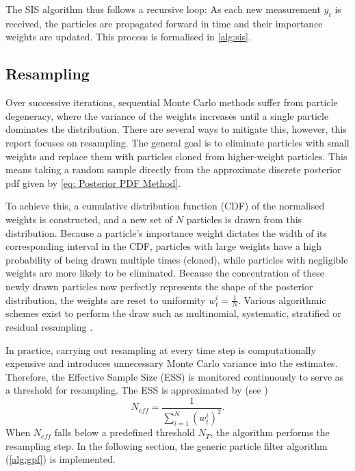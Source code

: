 \documentclass[10pt, a4paper]{article}
\numberwithin{equation}{section}
\begin{document}
The SIS algorithm thus follows a recursive loop: As each new measurement \(y_t\) is received, the particles are propagated forward in time and their importance weights are updated. This process is formalised in \autoref{alg:sis}.

\begin{algorithm}[ht]
\caption{SIS Particle Filter}\label{alg:sis}
\begin{algorithmic}[1]
\ttfamily
{}
\EndFor{}
\end{algorithmic}
\end{algorithm}


\subsection{Resampling}

Over successive iterations, sequential Monte Carlo methods suffer from particle degeneracy, where the variance of the weights increases until a single particle dominates the distribution. There are several ways to mitigate this, however, this report focuses on resampling. The general goal is to eliminate particles with small weights and replace them with particles cloned from higher-weight particles. This means taking a random sample directly from the approximate discrete posterior pdf given by \autoref{eq: Posterior PDF Method}. 

To achieve this, a cumulative distribution function (CDF) of the normalised weights is constructed, and a new set of \(N\) particles is drawn from this distribution. Because a particle's importance weight dictates the width of its corresponding interval in the CDF, particles with large weights have a high probability of being drawn multiple times (cloned), while particles with negligible weights are more likely to be eliminated. Because the concentration of these newly drawn particles now perfectly represents the shape of the posterior distribution, the weights are reset to uniformity \(w_t^{i} = \frac{1}{N}\). Various algorithmic schemes exist to perform the draw such as multinomial, systematic, stratified or residual resampling \parencite{Douc2005,Elfring2021}.

In practice, carrying out resampling at every time step is computationally expensive and introduces unnecessary Monte Carlo variance into the estimates. Therefore, the Effective Sample Size (ESS) is monitored continuously to serve as a threshold for resampling. The ESS is approximated by (see \textcite{Kong1994SequentialIA})
\begin{equation}
    N_{eff} = \frac{1}{\sum_{i=1}^N {(w_t^{i})}^2}.\label{eq: ess}
\end{equation}
When \(N_{eff}\) falls below a predefined threshold \(N_T\), the algorithm performs the resampling step. 
In the following section, the generic particle filter algorithm (\autoref{alg:gpf}) is implemented.
\end{document}

